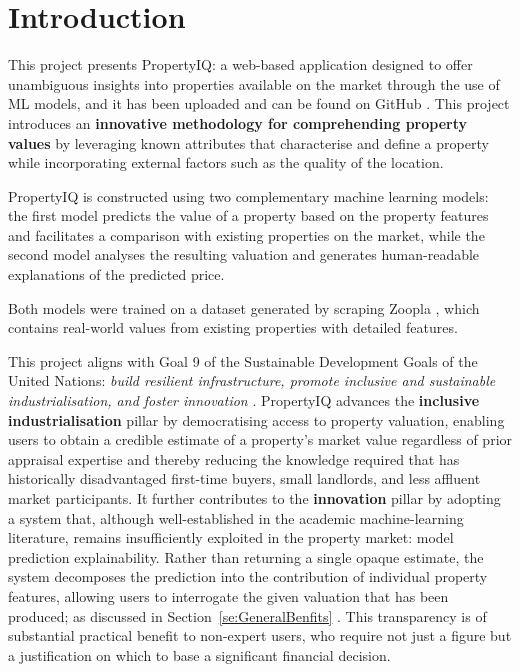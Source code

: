 \chapter{Introduction}
 \setcounter{page}{1}

This project presents PropertyIQ: a web-based application designed to offer unambiguous insights into properties available on the market through the use of ML models, and it has been uploaded and can be found on GitHub \parencite{Kirilov2026}. This project introduces an \textbf{innovative methodology for comprehending property values} by leveraging known attributes that characterise and define a property while incorporating external factors such as the quality of the location.              

PropertyIQ is constructed using two complementary machine learning models: the first model predicts the value of a property based on the property features and facilitates a comparison with existing properties on the market, while the second model analyses the resulting valuation and generates human-readable explanations of the predicted price. 

Both models were trained on a dataset generated by scraping Zoopla \parencite{Data2024}, which contains real-world values from existing properties with detailed features.

This project aligns with Goal 9 of the Sustainable Development Goals of the United Nations: \textit{build resilient infrastructure, promote inclusive and sustainable industrialisation, and foster innovation} \parencite{UnitedNations2011}. PropertyIQ advances the \textbf{inclusive industrialisation} pillar by democratising access to property valuation, enabling users to obtain a credible estimate of a property's market value regardless of prior appraisal expertise and thereby reducing the knowledge required that has historically disadvantaged first-time buyers, small landlords, and less affluent market participants. It further contributes to the \textbf{innovation} pillar by adopting a system that, although well-established in the academic machine-learning literature, remains insufficiently exploited in the property market: model prediction explainability. Rather than returning a single opaque estimate, the system decomposes the prediction into the contribution of individual property features, allowing users to interrogate the given valuation that has been produced; as discussed in Section~\ref{se:GeneralBenfits} . This transparency is of substantial practical benefit to non-expert users, who require not just a figure but a justification on which to base a significant financial decision.



